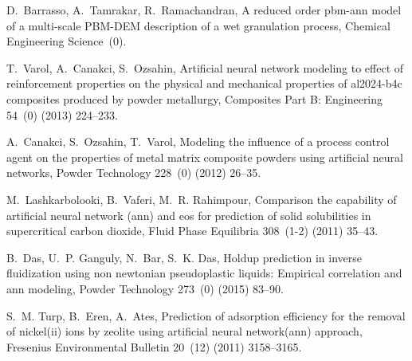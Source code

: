 \documentclass[review]{elsarticle}
\begin{document}
\begin{thebibliography}{10}
D.~Barrasso, A.~Tamrakar, R.~Ramachandran, A reduced order pbm-ann model of a
  multi-scale PBM-DEM description of a wet granulation process, Chemical
  Engineering Science~(0).

T.~Varol, A.~Canakci, S.~Ozsahin, Artificial neural network modeling to effect
  of reinforcement properties on the physical and mechanical properties of
  al2024-b4c composites produced by powder metallurgy, Composites Part B:
  Engineering 54~(0) (2013) 224--233.

A.~Canakci, S.~Ozsahin, T.~Varol, Modeling the influence of a process control
  agent on the properties of metal matrix composite powders using artificial
  neural networks, Powder Technology 228~(0) (2012) 26--35.

M.~Lashkarbolooki, B.~Vaferi, M.~R. Rahimpour, Comparison the capability of
  artificial neural network (ann) and eos for prediction of solid solubilities
  in supercritical carbon dioxide, Fluid Phase Equilibria 308~(1-2) (2011)
  35--43.

B.~Das, U.~P. Ganguly, N.~Bar, S.~K. Das, Holdup prediction in inverse
  fluidization using non newtonian pseudoplastic liquids: Empirical correlation
  and ann modeling, Powder Technology 273~(0) (2015) 83--90.

S.~M. Turp, B.~Eren, A.~Ates, Prediction of adsorption efficiency for the
  removal of nickel(ii) ions by zeolite using artificial neural network(ann)
  approach, Fresenius Environmental Bulletin 20~(12) (2011) 3158--3165.

\end{thebibliography}

\end{document}
